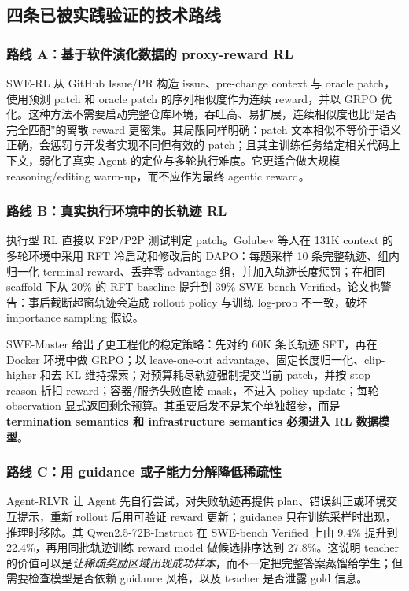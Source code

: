 \documentclass[10pt,a4paper,UTF8,fontset=none]{ctexart}
\begin{document}
\subsection{四条已被实践验证的技术路线}

\subsubsection{路线 A：基于软件演化数据的 proxy-reward RL}

SWE-RL 从 GitHub Issue/PR 构造 issue、pre-change context 与 oracle patch，使用预测 patch 和 oracle patch 的序列相似度作为连续 reward，并以 GRPO 优化\cite{wei2025swerl}。这种方法不需要启动完整仓库环境，吞吐高、易扩展，连续相似度也比“是否完全匹配”的离散 reward 更密集。其局限同样明确：patch 文本相似不等价于语义正确，会惩罚与开发者实现不同但有效的 patch；且其主训练任务给定相关代码上下文，弱化了真实 Agent 的定位与多轮执行难度。它更适合做大规模 reasoning/editing warm-up，而不应作为最终 agentic reward。

\subsubsection{路线 B：真实执行环境中的长轨迹 RL}

执行型 RL 直接以 F2P/P2P 测试判定 patch。Golubev 等人在 131K context 的多轮环境中采用 RFT 冷启动和修改后的 DAPO：每题采样 10 条完整轨迹、组内归一化 terminal reward、丢弃零 advantage 组，并加入轨迹长度惩罚；在相同 scaffold 下从 20\% 的 RFT baseline 提升到 39\% SWE-bench Verified\cite{golubev2025longcontextrl}。论文也警告：事后截断超窗轨迹会造成 rollout policy 与训练 log-prob 不一致，破坏 importance sampling 假设。

SWE-Master 给出了更工程化的稳定策略\cite{song2026swemaster}：先对约 60K 条长轨迹 SFT，再在 Docker 环境中做 GRPO；以 leave-one-out advantage、固定长度归一化、clip-higher 和去 KL 维持探索；对预算耗尽轨迹强制提交当前 patch，并按 stop reason 折扣 reward；容器/服务失败直接 mask，不进入 policy update；每轮 observation 显式返回剩余预算。其重要启发不是某个单独超参，而是\textbf{termination semantics 和 infrastructure semantics 必须进入 RL 数据模型}。

\subsubsection{路线 C：用 guidance 或子能力分解降低稀疏性}

Agent-RLVR 让 Agent 先自行尝试，对失败轨迹再提供 plan、错误纠正或环境交互提示，重新 rollout 后用可验证 reward 更新；guidance 只在训练采样时出现，推理时移除\cite{da2025agentrlvr}。其 Qwen2.5-72B-Instruct 在 SWE-bench Verified 上由 9.4\% 提升到 22.4\%，再用同批轨迹训练 reward model 做候选排序达到 27.8\%。这说明 teacher 的价值可以是\emph{让稀疏奖励区域出现成功样本}，而不一定把完整答案蒸馏给学生；但需要检查模型是否依赖 guidance 风格，以及 teacher 是否泄露 gold 信息。
\end{document}

